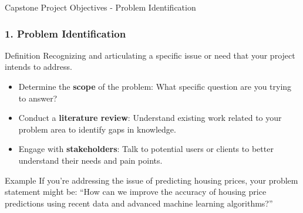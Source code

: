 \documentclass[aspectratio=169]{beamer}
\begin{document}
\begin{frame}[fragile]{Capstone Project Objectives - Problem Identification}
    \frametitle{1. Problem Identification}
    
    \begin{block}{Definition}
        Recognizing and articulating a specific issue or need that your project intends to address.
    \end{block}

    \begin{itemize}
        \item Determine the \textbf{scope} of the problem: What specific question are you trying to answer?
        \item Conduct a \textbf{literature review}: Understand existing work related to your problem area to identify gaps in knowledge.
        \item Engage with \textbf{stakeholders}: Talk to potential users or clients to better understand their needs and pain points.
    \end{itemize}

    \begin{block}{Example}
        If you're addressing the issue of predicting housing prices, your problem statement might be: 
        ``How can we improve the accuracy of housing price predictions using recent data and advanced machine learning algorithms?''
    \end{block}
\end{frame}
\end{document}
